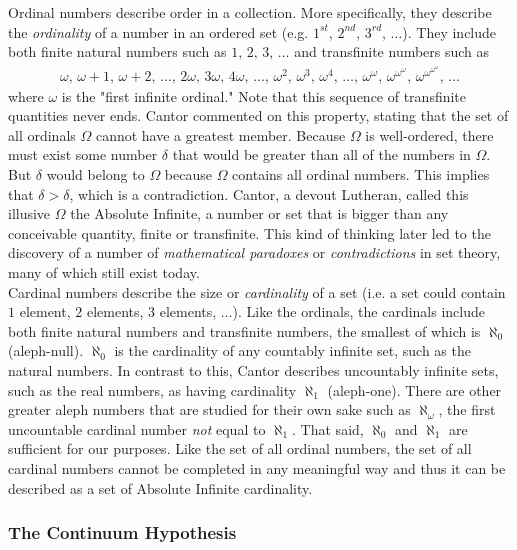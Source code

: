 Ordinal numbers describe order in a collection. More specifically, they describe the \textit{ordinality} of a number in an ordered set (e.g. $1^\textit{st}$, $2^\textit{nd}$, $3^\textit{rd}$, $\dots$). They include both finite natural numbers such as $1,\,2,\,3,\,\dots$ and transfinite numbers such as
\begin{align*}
\omega,\,\omega+1,\,\omega+2,\,\dots,\,2\omega,\,3\omega,\,4\omega,\,\dots,\,\omega^2,\,\omega^3,\,\omega^4,\,\dots,\,\omega^\omega,\,\omega^{\omega^\omega},\,\omega^{\omega^{\omega^\omega}},\,\dots
\end{align*}
where $\omega$ is the "first infinite ordinal." Note that this sequence of transfinite quantities never ends. Cantor commented on this property, stating that the set of all ordinals $\Omega$ cannot have a greatest member. Because $\Omega$ is well-ordered, there must exist some number $\delta$ that would be greater than all of the numbers in $\Omega$. But $\delta$ would belong to $\Omega$ because $\Omega$ contains all ordinal numbers. This implies that $\delta>\delta$, which is a contradiction. Cantor, a devout Lutheran, called this illusive $\Omega$ the Absolute Infinite, a number or set that is bigger than any conceivable quantity, finite or transfinite. This kind of thinking later led to the discovery of a number of \textit{mathematical paradoxes} or \textit{contradictions} in set theory, many of which still exist today. \\

Cardinal numbers describe the size or \textit{cardinality} of a set (i.e. a set could contain $1$ element, $2$ elements, $3$ elements, $\dots$). Like the ordinals, the cardinals include both finite natural numbers and transfinite numbers, the smallest of which is $\aleph_0$ (aleph-null). $\aleph_0$ is the cardinality of any countably infinite set, such as the natural numbers. In contrast to this, Cantor describes uncountably infinite sets, such as the real numbers, as having cardinality $\aleph_1$ (aleph-one). There are other greater aleph numbers that are studied for their own sake such as $\aleph_\omega$, the first uncountable cardinal number \textit{not} equal to $\aleph_1$. That said, $\aleph_0$ and $\aleph_1$ are sufficient for our purposes. Like the set of all ordinal numbers, the set of all cardinal numbers cannot be completed in any meaningful way and thus it can be described as a set of Absolute Infinite cardinality. \\

\subsubsection{The Continuum Hypothesis}

